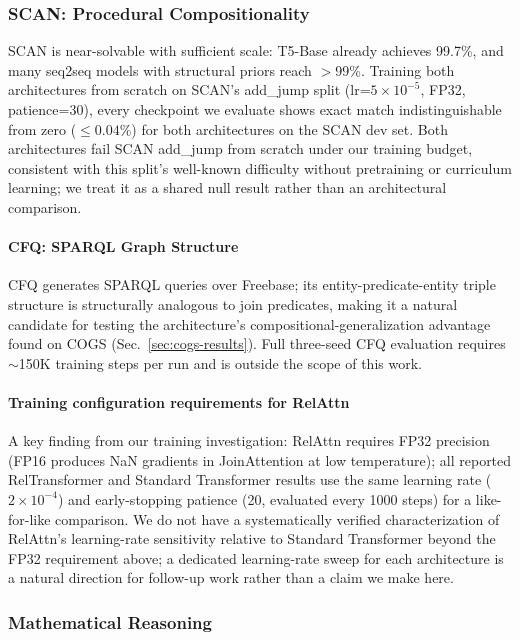 \documentclass[review]{elsarticle}
\begin{document}
\subsubsection{SCAN: Procedural Compositionality}
\label{sec:scan-results}
SCAN is near-solvable with sufficient scale: T5-Base already achieves 99.7\%, and many seq2seq models with structural priors reach $>$99\%. Training both architectures from scratch on SCAN's add\_jump split (lr=$5{\times}10^{-5}$, FP32, patience=30), every checkpoint we evaluate shows exact match indistinguishable from zero (${\le}0.04\%$) for both architectures on the SCAN dev set. Both architectures fail SCAN add\_jump from scratch under our training budget, consistent with this split's well-known difficulty without pretraining or curriculum learning; we treat it as a shared null result rather than an architectural comparison.

\paragraph{CFQ: SPARQL Graph Structure}
CFQ generates SPARQL queries over Freebase; its entity-predicate-entity triple structure is structurally analogous to join predicates, making it a natural candidate for testing the architecture's compositional-generalization advantage found on COGS (Sec.~\ref{sec:cogs-results}). Full three-seed CFQ evaluation requires ${\sim}$150K training steps per run and is outside the scope of this work.

\paragraph{Training configuration requirements for RelAttn}
A key finding from our training investigation: RelAttn requires FP32 precision (FP16 produces NaN gradients in JoinAttention at low temperature); all reported RelTransformer and Standard Transformer results use the same learning rate ($2{\times}10^{-4}$) and early-stopping patience (20, evaluated every 1000 steps) for a like-for-like comparison. We do not have a systematically verified characterization of RelAttn's learning-rate sensitivity relative to Standard Transformer beyond the FP32 requirement above; a dedicated learning-rate sweep for each architecture is a natural direction for follow-up work rather than a claim we make here.

\subsubsection{Mathematical Reasoning}
\label{sec:gsm8k-results}
\end{document}
